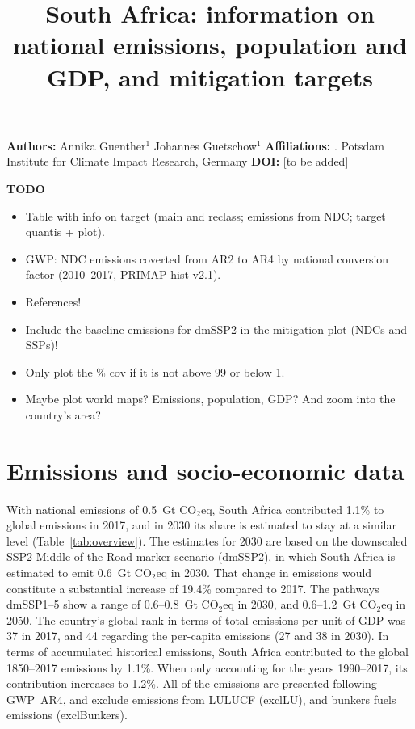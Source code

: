 \documentclass[12pt]{article}
\title{ \bfseries \color{PIKorange} South Africa: information on national emissions, population and GDP, and mitigation targets}
\begin{document}
 \maketitle

 \noindent \textbf{Authors:} \newline
 \indent Annika Guenther$^{1}$ \newline
 \indent Johannes Guetschow$^{1}$ \newline
 \noindent \textbf{Affiliations:} \newline
 . Potsdam Institute for Climate Impact Research, Germany \newline
 \noindent \textbf{DOI:} [to be added] \newline

 \textbf{TODO}
 \begin{itemize}
 \item Table with info on target (main and reclass; emissions from NDC; target quantis + plot).
 \item GWP: NDC emissions coverted from AR2 to AR4 by national conversion factor (2010--2017, PRIMAP-hist v2.1).
 \item References!
 \item Include the baseline emissions for dmSSP2 in the mitigation plot (NDCs and SSPs)!
 \item Only plot the \% cov if it is not above 99 or below 1.
 \item Maybe plot world maps? Emissions, population, GDP? And zoom into the country's area?
 \end{itemize}

 \newpage %
 \section{Emissions and socio-economic data}
 \label{sec:nonLULUCFSocioEco}
 With national emissions of 0.5~Gt CO$_2$eq, South Africa contributed 1.1\% to global emissions in 2017, and in 2030 its share is estimated to stay at a similar level (Table~\ref{tab:overview}).
 The estimates for 2030 are based on the downscaled SSP2 Middle of the Road marker scenario (dmSSP2), in which South Africa is estimated to emit 0.6~Gt CO$_2$eq in 2030.
 That change in emissions would constitute a substantial increase of 19.4\% compared to 2017. 
 The pathways dmSSP1--5 show a range of 0.6--0.8~Gt CO$_2$eq in 2030, and 0.6--1.2~Gt CO$_2$eq in 2050.
 The country's global rank in terms of total emissions per unit of GDP was 37 in 2017, and 44 regarding the per-capita emissions (27 and 38 in 2030).
 In terms of accumulated historical emissions, South Africa contributed to the global 1850--2017 emissions by 1.1\%. 
 When only accounting for the years 1990--2017, its contribution increases to 1.2\%.
 All of the emissions are presented following GWP~AR4, and exclude emissions from LULUCF (exclLU), and bunkers fuels emissions (exclBunkers).
\end{document}
